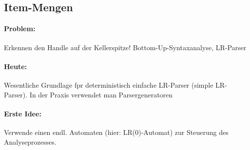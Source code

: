 \subsection{Item-Mengen}
\paragraph*{Problem:} Erkennen den Handle auf der Kellerspitze!
Bottom-Up-Syntaxanalyse, LR-Parser
\paragraph*{Heute:} Wesentliche Grundlage fpr deterministisch einfache LR-Parser (simple LR-Parser). In der Praxis verwendet man Parsergeneratoren
\paragraph*{Erste Idee:} Verwende einen endl. Automaten (hier: LR(0)-Automat) zur Steuerung des Analyseprozesses.
